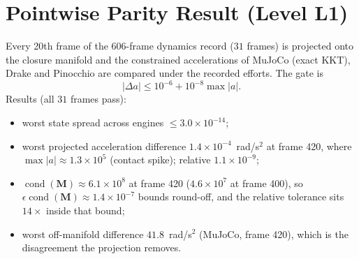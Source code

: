\documentclass[11pt,a4paper]{article}
\newcommand{\bM}{\mathbf{M}}
\begin{document}
\section{Pointwise Parity Result (Level L1)}
Every 20th frame of the 606-frame dynamics record ($31$ frames) is projected
onto the closure manifold and the constrained accelerations of MuJoCo (exact
KKT), Drake and Pinocchio are compared under the recorded efforts.  The gate is
\begin{equation}
|\Delta a|\le 10^{-6}+10^{-8}\max|a| .
\end{equation}
Results (all $31$ frames pass):
\begin{itemize}[nosep]
\item worst state spread across engines $\le 3.0\times10^{-14}$;
\item worst projected acceleration difference $1.4\times10^{-4}$~rad/s$^2$ at
  frame 420, where $\max|a|\approx1.3\times10^{5}$ (contact spike); relative
  $1.1\times10^{-9}$;
\item $\operatorname{cond}(\bM)\approx6.1\times10^{8}$ at frame 420
  ($4.6\times10^{7}$ at frame 400), so $\epsilon\operatorname{cond}(\bM)\approx
  1.4\times10^{-7}$ bounds round-off, and the relative tolerance sits $14\times$
  inside that bound;
\item worst off-manifold difference $41.8$~rad/s$^2$ (MuJoCo, frame 420), which
  is the disagreement the projection removes.
\end{itemize}

\begin{table}[h]
\centering\small
{}
\caption{Selected frames of the pointwise receipt.  Differences are absolute
rad/s$^2$ against Pinocchio; ``Proj.'' is after closure projection and
``Off-man.'' is at the raw recorded state.}
\end{table}
\end{document}
